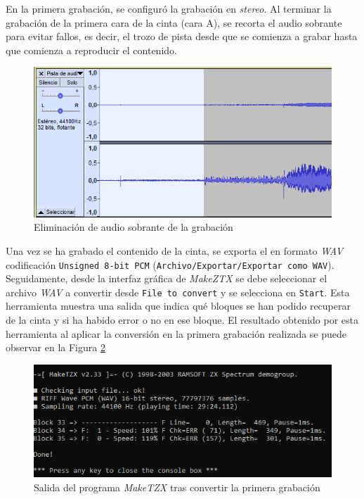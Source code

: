 \documentclass{article}
\begin{document}
En la primera grabación, se configuró la grabación en \textit{stereo}. Al terminar la grabación de la primera cara de la cinta (cara A), se recorta el audio sobrante para evitar fallos, es decir, el trozo de pista desde que se comienza a grabar hasta que comienza a reproducir el contenido.\\
\begin{figure}[h!]
    \centering
    \includegraphics[scale=0.5]{images/audio-sobrante.png}
    \caption{Eliminación de audio sobrante de la grabación}
    \label{fig:audio-sobrante}
\end{figure}

Una vez se ha grabado el contenido de la cinta, se exporta el en formato \textit{WAV} codificación \texttt{Unsigned 8-bit PCM} (\texttt{Archivo/Exportar/Exportar como WAV}). Seguidamente, desde la interfaz gráfica de \textit{MakeZTX} se debe seleccionar el archivo \textit{WAV} a convertir desde \texttt{File to convert} y se selecciona en \texttt{Start}. Esta herramienta muestra una salida que indica qué bloques se han podido recuperar de la cinta y si ha habido error o no en ese bloque. El resultado obtenido por esta herramienta al aplicar la conversión en la primera grabación realizada se puede observar en la Figura \ref{fig:stereo-bad}\\

\begin{figure}[h!]
    \centering
    \includegraphics[scale=0.5]{images/stereo-bad.png}
    \caption{Salida del programa \textit{MakeTZX} tras convertir la primera grabación}
    \label{fig:stereo-bad}
\end{figure}
\end{document}
